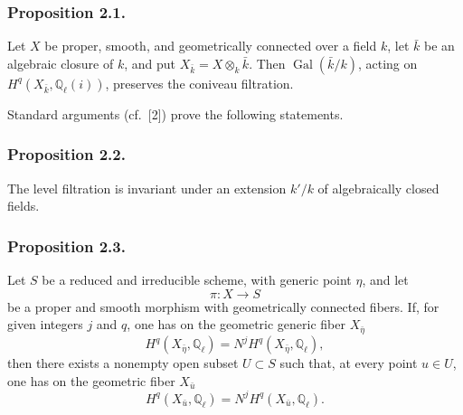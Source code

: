 \subsubsection*{Proposition 2.1.}
Let $X$ be proper, smooth, and geometrically connected over a field $k$, let
$\bar k$ be an algebraic closure of $k$, and put
$X_{\bar k}=X\otimes_k\bar k$.  Then $\operatorname{Gal}(\bar k/k)$,
acting on $H^q(X_{\bar k},\mathbb Q_\ell(i))$, preserves the coniveau
filtration.

Standard arguments (cf.~[2]) prove the following statements.

\subsubsection*{Proposition 2.2.}
The level filtration is invariant under an extension $k'/k$ of
algebraically closed fields.

\subsubsection*{Proposition 2.3.}
Let $S$ be a reduced and irreducible scheme, with generic point $\eta$, and
let
\begin{equation*}
\pi:X\longrightarrow S
\end{equation*}
be a proper and smooth morphism with geometrically connected fibers.  If,
for given integers $j$ and $q$, one has on the geometric generic fiber
$X_{\bar\eta}$
\begin{equation}\tag{2.3.1}
H^q(X_{\bar\eta},\mathbb Q_\ell)
=N^jH^q(X_{\bar\eta},\mathbb Q_\ell),
\end{equation}
then there exists a nonempty open subset $U\subset S$ such that, at every
point $u\in U$, one has on the geometric fiber $X_{\bar u}$
\begin{equation}\tag{2.3.2}
H^q(X_{\bar u},\mathbb Q_\ell)
=N^jH^q(X_{\bar u},\mathbb Q_\ell).
\end{equation}

